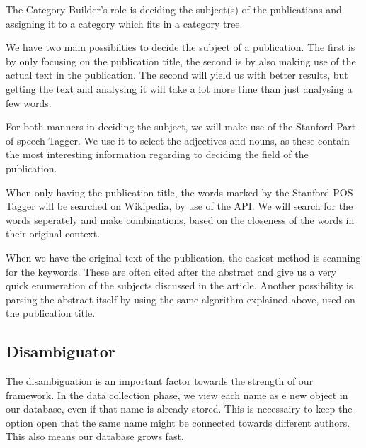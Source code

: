 
The Category Builder's role is deciding the subject(s) of the publications and assigning it to a category which fits in a category tree.


We have two main possibilties to decide the subject of a publication. The first is by only focusing on the publication title, the second is by also making use of the actual text in the publication. The second will yield us with better results, but getting the text and analysing it will take a lot more time than just analysing a few words. 

For both manners in deciding the subject, we will make use of the Stanford Part-of-speech Tagger. We use it to select the adjectives and nouns, as these contain the most interesting information regarding to deciding the field of the publication.

When only having the publication title, the words marked by the Stanford POS Tagger will be searched on Wikipedia, by use of the API. We will search for the words seperately and make combinations, based on the closeness of the words in their original context.


When we have the original text of the publication, the easiest method is scanning for the keywords. These are often cited after the abstract and give us a very quick enumeration of the subjects discussed in the article. Another possibility is parsing the abstract itself by using the same algorithm explained above, used on the publication title.


\subsection{Disambiguator}
\label{disambiguator}

The disambiguation is an important factor towards the strength of our framework. In the data collection phase, we view each name as e new object in our database, even if that name is already stored. This is necessairy to keep the option open that the same name might be connected towards different authors. This also means our database grows fast. 

